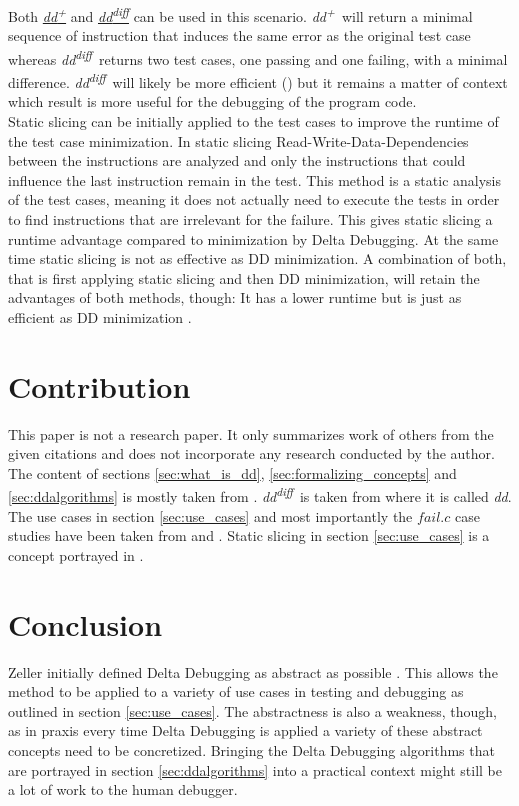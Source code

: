 \documentclass[a4paper,UKenglish]{lipics-v2018}
\newcommand{\ddp}{\textit{dd\textsuperscript{+}}}
\newcommand{\dddiff}{\textit{dd\textsuperscript{diff}}}
\begin{document}
Both \hyperref[fig:ddp]{\ddp} and \hyperref[fig:dddiff]{\dddiff} can be used in this scenario. \ddp\ will return a minimal sequence of instruction that induces the same error as the original test case whereas \dddiff\ returns two test cases, one passing and one failing, with a minimal difference. \dddiff\ will likely be more efficient (\cite{Zeller:2002:SIF:506201.506206})
 but it remains a matter of context which result is more useful for the debugging of the program code.\\

Static slicing can be initially applied to the test cases to improve the runtime of the test case minimization. In static slicing Read-Write-Data-Dependencies between the instructions are analyzed and only the instructions that could influence the last instruction remain in the test. This method is a static analysis of the test cases, meaning it does not actually need to execute the tests in order to find instructions that are irrelevant for the failure. This gives static slicing a runtime advantage compared to minimization by Delta Debugging. At the same time static slicing is not as effective as DD minimization. A combination of both, that is first applying static slicing and then DD minimization, will retain the advantages of both methods, though: It has a lower runtime but is just as efficient as DD minimization \cite{Leitner:2007:EUT:1321631.1321698}.

\section{Contribution}
\label{sec:contribution}

This paper is not a research paper. It only summarizes work of others from the given citations and does not incorporate any research conducted by the author. The content of sections \ref{sec:what_is_dd}, \ref{sec:formalizing_concepts} and \ref{sec:ddalgorithms} is mostly taken from \cite{Zeller:1999:YMP:318774.318946}. \dddiff\ is taken from \cite{Zeller:2002:SIF:506201.506206} where it is called \textit{dd}. The use cases in section \ref{sec:use_cases} and most importantly the $fail.c$ case studies have been taken from \cite{Zeller:2002:ICC:587051.587053} and \cite{Lei:2005:MRU:1104997.1105255}. Static slicing in section \ref{sec:use_cases} is a concept portrayed in \cite{Leitner:2007:EUT:1321631.1321698}.

\section{Conclusion}
\label{sec:conclusion}
Zeller initially defined Delta Debugging as abstract as possible \cite{Zeller:1999:YMP:318774.318946}. This allows the method to be applied to a variety of use cases in testing and debugging as outlined in section \ref{sec:use_cases}. The abstractness is also a weakness, though, as in praxis every time Delta Debugging is applied a variety of these abstract concepts need to be concretized. Bringing the Delta Debugging algorithms that are portrayed in section \ref{sec:ddalgorithms} into a practical context might still be a lot of work to the human debugger.
\end{document}
